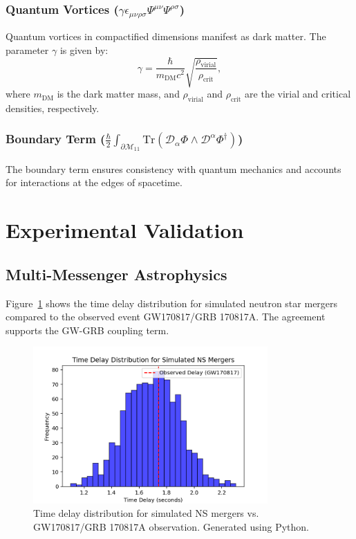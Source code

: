 \documentclass[12pt, a4paper]{article}
\begin{document}
\subsubsection{Quantum Vortices ($\gamma \epsilon_{\mu\nu\rho\sigma} \Psi^{\mu\nu} \Psi^{\rho\sigma}$)}
Quantum vortices in compactified dimensions manifest as dark matter. The parameter \(\gamma\) is given by:
\[
\gamma = \frac{\hbar}{m_{\text{DM}} c^2} \sqrt{\frac{\rho_{\text{virial}}}{\rho_{\text{crit}}}},
\]
where \(m_{\text{DM}}\) is the dark matter mass, and \(\rho_{\text{virial}}\) and \(\rho_{\text{crit}}\) are the virial and critical densities, respectively.

\subsubsection{Boundary Term ($\frac{\hbar}{2} \int_{\partial\mathcal{M}_{11}} \text{Tr}\left( \mathcal{D}_\alpha \Phi \wedge \mathcal{D}^\alpha \Phi^\dagger \right)$)}
The boundary term ensures consistency with quantum mechanics and accounts for interactions at the edges of spacetime.

\section{Experimental Validation}
\subsection{Multi-Messenger Astrophysics}
Figure~\ref{fig:gw_grb_delay} shows the time delay distribution for simulated neutron star mergers compared to the observed event GW170817/GRB 170817A. The agreement supports the GW-GRB coupling term.

\begin{figure}[H]
\centering
\includegraphics[width=0.8\textwidth]{gw_grb_delay.png}
\caption{Time delay distribution for simulated NS mergers vs. GW170817/GRB 170817A observation. Generated using Python.}
\label{fig:gw_grb_delay}
\end{figure}
\end{document}
